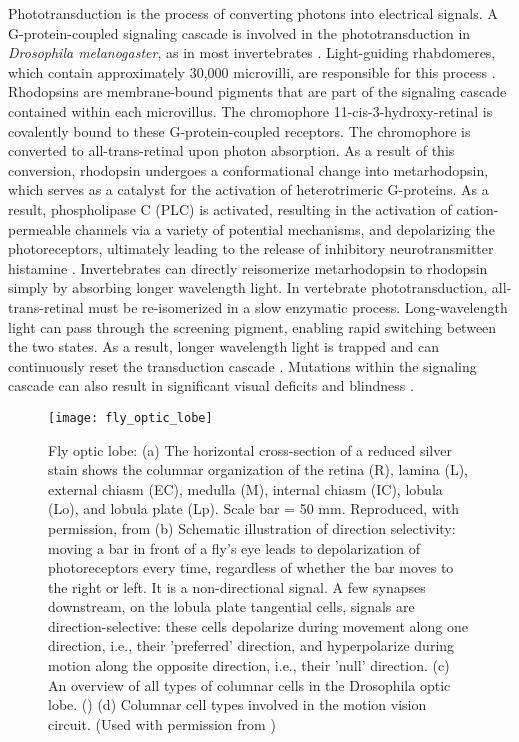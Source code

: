 Phototransduction is the process of converting photons into electrical signals. A G-protein-coupled signaling cascade is involved in the phototransduction in \textit{Drosophila melanogaster}, as in most invertebrates \parencite{Hardie2015}. Light-guiding rhabdomeres, which contain approximately 30,000 microvilli, are responsible for this process \parencite{Hardie2001}. Rhodopsins are membrane-bound pigments that are part of the signaling cascade contained within each microvillus. The chromophore 11-cis-3-hydroxy-retinal is covalently bound to these G-protein-coupled receptors. The chromophore is converted to all-trans-retinal upon photon absorption. As a result of this conversion, rhodopsin undergoes a conformational change into metarhodopsin, which serves as a catalyst for the activation of heterotrimeric G-proteins. As a result, phospholipase C (PLC) is activated, resulting in the activation of cation-permeable channels via a variety of potential mechanisms, and depolarizing the photoreceptors, ultimately leading to the release of inhibitory neurotransmitter histamine \parencite{Hardie2001}. Invertebrates can directly reisomerize metarhodopsin to rhodopsin simply by absorbing longer wavelength light. In vertebrate phototransduction, all-trans-retinal must be re-isomerized in a slow enzymatic process. Long-wavelength light can pass through the screening pigment, enabling rapid switching between the two states. As a result, longer wavelength light is trapped and can continuously reset the transduction cascade \parencite{Hardie2001}. Mutations within the signaling cascade can also result in significant visual deficits and blindness \parencite{Hardie2012}.

\begin{figure}
\centering
\hspace*{-1cm} 
\texttt{[image: fly\_optic\_lobe]}
\caption[Fly optic lobe] {Fly optic lobe: (a) The horizontal cross-section of a reduced silver stain shows the columnar organization of the retina (R), lamina (L), external chiasm (EC), medulla (M), internal chiasm (IC), lobula (Lo), and lobula plate (Lp). Scale bar = 50 mm. Reproduced, with permission, from \cite{Takemura2008} (b) Schematic illustration of direction selectivity: moving a bar in front of a fly's eye leads to depolarization of photoreceptors every time, regardless of whether the bar moves to the right or left. It is a non-directional signal. A few synapses downstream, on the lobula plate tangential cells, signals are direction-selective: these cells depolarize during movement along one direction, i.e., their 'preferred' direction, and hyperpolarize during motion along the opposite direction, i.e., their 'null' direction. (c) An overview of all types of columnar cells in the Drosophila optic lobe. (\cite{Fischbach1989}) (d) Columnar cell types involved in the motion vision circuit. (Used with permission from \cite{Borst2020, Borst2020b})}
\label{fig:opticlobe}
\end{figure}

